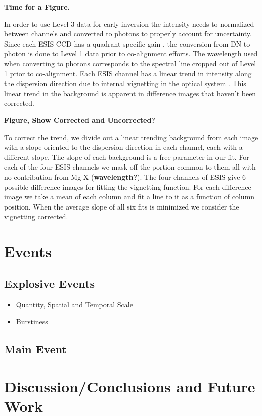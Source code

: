         \textbf{Time for a Figure.}
        
        In order to use Level 3 data for early inversion the intensity needs to normalized between channels and converted to photons to properly account for uncertainty.
        Since each ESIS CCD has a quadrant specific gain \citep{ESIS}, the conversion from DN to photon is done to Level 1 data prior to co-alignment efforts.
        The wavelength used when converting to photons corresponds to the spectral line cropped out of Level 1 prior to co-alignment.
        Each ESIS channel has a linear trend in intensity along the dispersion direction due to internal vignetting in the optical system \citep{ESIS}.
        This linear trend in the background is apparent in difference images that haven't been corrected.
        
        \textbf{Figure, Show Corrected and Uncorrected?}
        
        To correct the trend, we divide out a linear trending background from each image with a slope oriented to the dispersion direction in each channel, each with a different slope.
        The slope of each background is a free parameter in our fit.
        For each of the four ESIS channels we mask off the portion common to them all with no contribution from Mg X (\textbf{wavelength?}).
        The four channels of ESIS give 6 possible difference images for fitting the vignetting function. 
        For each difference image we take a mean of each column and fit a line to it as a function of column position.
        When the average slope of all six fits is minimized we consider the vignetting corrected. 
        
\section{Events}
    \subsection{Explosive Events}
        \begin{itemize}
            \item Quantity, Spatial and Temporal Scale
            \item Burstiness 
        \end{itemize}
    
    \subsection{Main Event}

\section{Discussion/Conclusions and Future Work}

